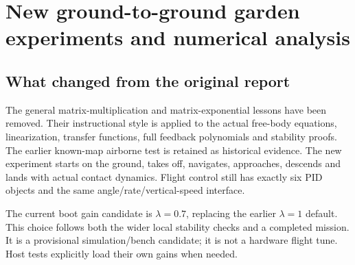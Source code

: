 \chapter{New ground-to-ground garden experiments and numerical analysis}
\section{What changed from the original report}
The general matrix-multiplication and matrix-exponential lessons have been
removed. Their instructional style is applied to the actual free-body equations,
linearization, transfer functions, full feedback polynomials and stability proofs.
The earlier known-map airborne test is retained as historical evidence. The new
experiment starts on the ground, takes off, navigates, approaches, descends and
lands with actual contact dynamics. Flight control still has exactly six PID
objects and the same angle/rate/vertical-speed interface.

The current boot gain candidate is $\lambda=0.7$, replacing the earlier
$\lambda=1$ default. This choice follows both the wider local stability checks
and a completed mission. It is a provisional simulation/bench candidate; it is
not a hardware flight tune. Host tests explicitly load their own gains when needed.
